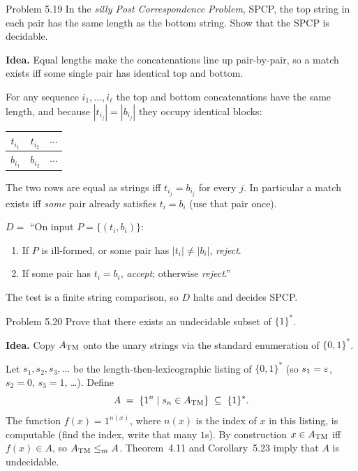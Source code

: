 \begin{question}{Problem 5.19}
In the \emph{silly Post Correspondence Problem}, SPCP, the top string in each pair has the same length as the bottom string. Show that the SPCP is decidable.
\end{question}
\begin{soln}
\textbf{Idea.} Equal lengths make the concatenations line up pair-by-pair, so a match exists iff some single pair has identical top and bottom.

For any sequence $i_1,\dots,i_\ell$ the top and bottom concatenations have the same length, and because $|t_{i_j}|=|b_{i_j}|$ they occupy identical blocks:
\begin{center}
\begin{tabular}{|c|c|c|}
\hline
$t_{i_1}$ & $t_{i_2}$ & $\cdots$ \\
\hline
$b_{i_1}$ & $b_{i_2}$ & $\cdots$ \\
\hline
\end{tabular}
\end{center}
The two rows are equal as strings iff $t_{i_j}=b_{i_j}$ for every $j$. In particular a match exists iff \emph{some} pair already satisfies $t_i=b_i$ (use that pair once).

$D=$ ``On input $P=\{(t_i,b_i)\}$:
\begin{enumerate}
\item If $P$ is ill-formed, or some pair has $|t_i|\ne|b_i|$, \emph{reject}.
\item If some pair has $t_i=b_i$, \emph{accept}; otherwise \emph{reject}.''
\end{enumerate}
The test is a finite string comparison, so $D$ halts and decides SPCP.
\end{soln}

\begin{question}{Problem 5.20}
Prove that there exists an undecidable subset of $\{1\}^*$.
\end{question}
\begin{soln}
\textbf{Idea.} Copy $A_{\mathrm{TM}}$ onto the unary strings via the standard enumeration of $\{0,1\}^*$.

Let $s_1,s_2,s_3,\dots$ be the length-then-lexicographic listing of $\{0,1\}^*$ (so $s_1=\varepsilon$, $s_2=0$, $s_3=1$, \ldots). Define
\[
A\;=\;\{1^n\mid s_n\in A_{\mathrm{TM}}\}\;\subseteq\;\{1\}^*.
\]
The function $f(x)=1^{n(x)}$, where $n(x)$ is the index of $x$ in this listing, is computable (find the index, write that many $1$s). By construction $x\in A_{\mathrm{TM}}$ iff $f(x)\in A$, so $A_{\mathrm{TM}}\le_{m} A$. Theorem~4.11 and Corollary~5.23 imply that $A$ is undecidable.
\end{soln}

